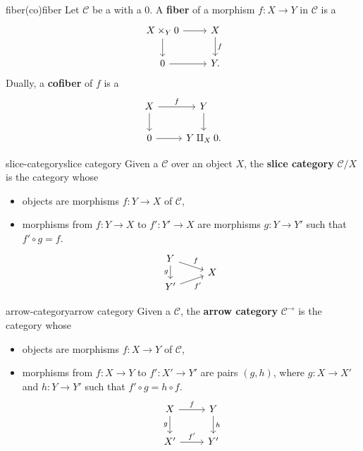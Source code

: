 \begin{topic}{fiber}{(co)fiber}
    Let $\mathcal{C}$ be a  with a  $0$. A \textbf{fiber} of a morphism $f : X \to Y$ in $\mathcal{C}$ is a 
    \[ \begin{tikzcd}
        X \times_Y 0 \arrow{r} \arrow{d} & X \arrow{d}{f} \\ 0 \arrow{r} & Y .
    \end{tikzcd} \]
    Dually, a \textbf{cofiber} of $f$ is a 
    \[ \begin{tikzcd}
        X \arrow{r}{f} \arrow{d} & Y \arrow{d} \\ 0 \arrow{r} & Y \amalg_X 0 .
    \end{tikzcd} \]
\end{topic}

\begin{topic}{slice-category}{slice category}
    Given a  $\mathcal{C}$ over an object $X$, the \textbf{slice category} $\mathcal{C}/X$ is the category whose
    \begin{itemize}
        \item objects are morphisms $f : Y \to X$ of $\mathcal{C}$,
        \item morphisms from $f : Y \to X$ to $f' : Y' \to X$ are morphisms $g : Y \to Y'$ such that $f' \circ g = f$.
        \[ \begin{tikzcd}[row sep=0em] Y \arrow{rd}{f} \arrow[swap]{dd}{g} & \\ & X \\ Y' \arrow[swap]{ur}{f'} & \end{tikzcd} \]
    \end{itemize}
\end{topic}

\begin{topic}{arrow-category}{arrow category}
    Given a  $\mathcal{C}$, the \textbf{arrow category} $\mathcal{C}^\rightarrow$ is the category whose
    \begin{itemize}
        \item objects are morphisms $f : X \to Y$ of $\mathcal{C}$,
        \item morphisms from $f : X \to Y$ to $f' : X' \to Y'$ are pairs $(g, h)$, where $g : X \to X'$ and $h : Y \to Y'$ such that $f' \circ g = h \circ f$.
        \[ \begin{tikzcd} X \arrow{r}{f} \arrow[swap]{d}{g} & Y \arrow{d}{h} \\ X' \arrow{r}{f'} & Y' \end{tikzcd} \]
    \end{itemize}
\end{topic}


